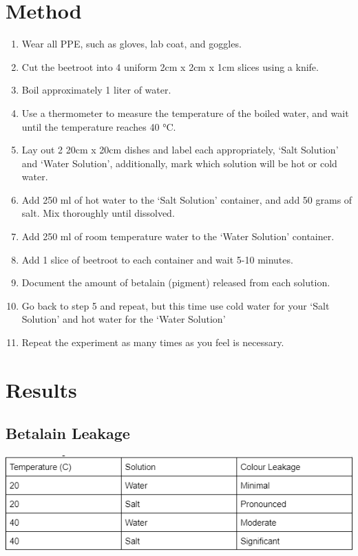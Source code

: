 \documentclass[a4paper,12pt,twoside,english]{all-in-one} %
\begin{document}
\section{Method}
\begin{enumerate}
    \item Wear all PPE, such as gloves, lab coat, and goggles.
    \item Cut the beetroot into 4 uniform 2cm x 2cm x 1cm slices using a knife.
    \item Boil approximately 1 liter of water.
    \item Use a thermometer to measure the temperature of the boiled water, and wait until the temperature reaches 40 °C.
    \item Lay out 2 20cm x 20cm dishes and label each appropriately, ‘Salt Solution’ and ‘Water Solution’, additionally, mark which solution will be hot or cold water.
    \item Add 250 ml of hot water to the ‘Salt Solution’ container, and add 50 grams of salt. Mix thoroughly until dissolved.
    \item Add 250 ml of room temperature water to the ‘Water Solution’ container.
    \item Add 1 slice of beetroot to each container and wait 5-10 minutes.
    \item Document the amount of betalain (pigment) released from each solution.
    \item Go back to step 5 and repeat, but this time use cold water for your ‘Salt Solution’ and hot water for the ‘Water Solution’
    \item Repeat the experiment as many times as you feel is necessary.
\end{enumerate}

\section{Results}
\subsection{Betalain Leakage}
\includegraphics[scale=1]{betalain_leakage.png}
\end{document}

